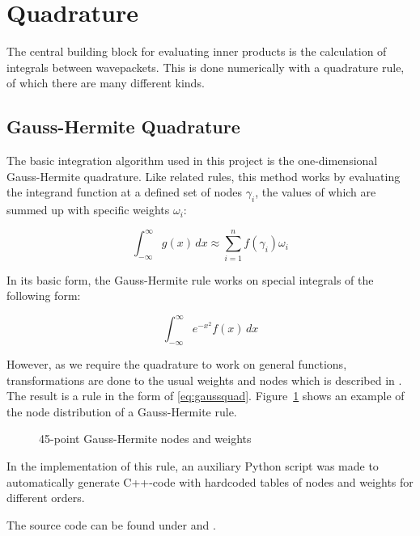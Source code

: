 \section{Quadrature}

The central building block for evaluating inner products is the calculation of
integrals between wavepackets.
This is done numerically with a quadrature rule, of which there are many
different kinds.


\subsection{Gauss-Hermite Quadrature}
\label{subsec:ghquad}

The basic integration algorithm used in this project is the one-dimensional
Gauss-Hermite quadrature.
Like related rules, this method works by evaluating the integrand function at a
defined set of nodes $\gamma_i$, the values of which are summed up with specific
weights $\omega_i$:

\begin{equation}
  \label{eq:gaussquad}
  \int_{-\infty}^{\infty} g(x) \, dx \approx \sum_{i=1}^{n} f(\gamma_i) \omega_i
\end{equation}

In its basic form, the Gauss-Hermite rule works on special integrals of the
following form:

\begin{equation}
  \int_{-\infty}^{\infty} e^{-x^2} f(x) \, dx
\end{equation}

However, as we require the quadrature to work on general functions,
transformations are done to the usual weights and nodes which is described in
\cite{B_master_thesis}.
The result is a rule in the form of \eqref{eq:gaussquad}.
Figure~\ref{fig:ghexample} shows an example of the node distribution of a
Gauss-Hermite rule.

\begin{figure}
  \center
  
  \caption{45-point Gauss-Hermite nodes and weights}
  \label{fig:ghexample}
\end{figure}

In the implementation of this rule, an auxiliary Python script was made to
automatically generate C++-code with hardcoded tables of nodes and weights for
different orders.

The source code can be found under  and
.


